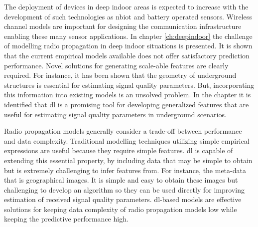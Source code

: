 The deployment of devices in deep indoor areas is expected to increase with the development of such technologies as \gls{nbiot} and battery operated sensors. Wireless channel models are important for designing the communication infrastructure enabling these many sensor applications. In chapter \ref{ch:deepindoor} the challenge of modelling radio propagation in deep indoor situations is presented. It is shown that the current empirical models available does not offer satisfactory prediction performance. Novel solutions for generating scale-able features are clearly required. For instance, it has been shown that the geometry of underground structures is essential for estimating signal quality parameters. But, incorporating this information into existing models is an unsolved problem. In the chapter it is identified that \gls{dl} is a promising tool for developing generalized features that are useful for estimating signal quality parameters in underground scenarios.

Radio propagation models generally consider a trade-off between performance and data complexity. Traditional modelling techniques utilizing simple empirical expressions are useful because they require simple features. \gls{dl} is capable of extending this essential property, by including data that may be simple to obtain but is extremely challenging to infer features from. For instance, the meta-data that is geographical images. It is simple and easy to obtain these images but challenging to develop an algorithm so they can be used directly for improving estimation of received signal quality parameters. \gls{dl}-based models are effective solutions for keeping data complexity of radio propagation models low while keeping the predictive performance high.
